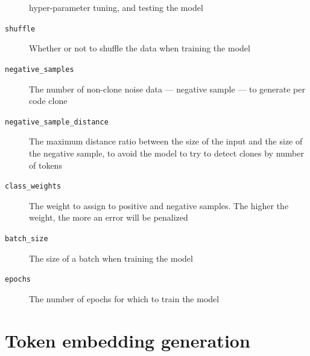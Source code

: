 \begin{description}
  hyper-parameter tuning, and testing the model
\item[{\small\texttt{shuffle}}] Whether or not to shuffle the data when training
  the model
\item[{\small\texttt{negative\_samples}}] The number of non-clone noise data ---
  negative sample --- to generate per code clone
\item[{\small\texttt{negative\_sample\_distance}}] The maximum distance ratio
  between the size of the input and the size of the negative sample, to avoid
  the model to try to detect clones by number of tokens
\item[{\small\texttt{class\_weights}}] The weight to assign to positive and
  negative samples. The higher the weight, the more an error will be penalized
\item[{\small\texttt{batch\_size}}] The size of a batch when training the model
\item[{\small\texttt{epochs}}] The number of epochs for which to train the model
\end{description}
\section{\label{sec:token-generation-experiments}Token embedding generation}
